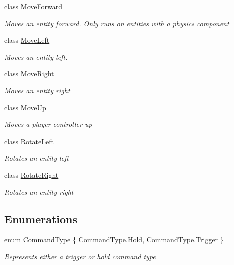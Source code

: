 \begin{DoxyCompactItemize}
class \hyperlink{class_midnight_blue_1_1_engine_1_1_i_o_1_1_move_forward}{Move\+Forward}
\begin{DoxyCompactList}\small\item\em Moves an entity forward. Only runs on entities with a physics component \end{DoxyCompactList}\item 
class \hyperlink{class_midnight_blue_1_1_engine_1_1_i_o_1_1_move_left}{Move\+Left}
\begin{DoxyCompactList}\small\item\em Moves an entity left. \end{DoxyCompactList}\item 
class \hyperlink{class_midnight_blue_1_1_engine_1_1_i_o_1_1_move_right}{Move\+Right}
\begin{DoxyCompactList}\small\item\em Moves an entity right \end{DoxyCompactList}\item 
class \hyperlink{class_midnight_blue_1_1_engine_1_1_i_o_1_1_move_up}{Move\+Up}
\begin{DoxyCompactList}\small\item\em Moves a player controller up \end{DoxyCompactList}\item 
class \hyperlink{class_midnight_blue_1_1_engine_1_1_i_o_1_1_rotate_left}{Rotate\+Left}
\begin{DoxyCompactList}\small\item\em Rotates an entity left \end{DoxyCompactList}\item 
class \hyperlink{class_midnight_blue_1_1_engine_1_1_i_o_1_1_rotate_right}{Rotate\+Right}
\begin{DoxyCompactList}\small\item\em Rotates an entity right \end{DoxyCompactList}\end{DoxyCompactItemize}
\subsection*{Enumerations}
\begin{DoxyCompactItemize}
\item 
enum \hyperlink{namespace_midnight_blue_1_1_engine_1_1_i_o_a8bc3f159399ecadd590f7df1b54354b0}{Command\+Type} \{ \hyperlink{namespace_midnight_blue_1_1_engine_1_1_i_o_a8bc3f159399ecadd590f7df1b54354b0abcd8db575b47c838e5d551e3973db4ac}{Command\+Type.\+Hold}, 
\hyperlink{namespace_midnight_blue_1_1_engine_1_1_i_o_a8bc3f159399ecadd590f7df1b54354b0af698f67f5666aff10729d8a1cb1c14d2}{Command\+Type.\+Trigger}
 \}\begin{DoxyCompactList}\small\item\em Represents either a trigger or hold command type \end{DoxyCompactList}
\end{DoxyCompactItemize}


